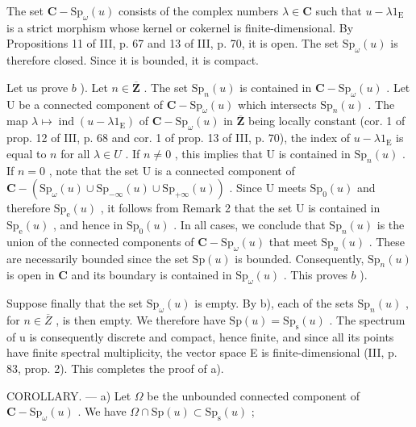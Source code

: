 The set \(\mathbf{C} - \mathrm{Sp}_{\omega}(u)\) consists of the complex numbers \(\lambda \in \mathbf{C}\) such that \(u - \lambda 1_{\mathrm{E}}\) is a strict morphism whose kernel or cokernel is finite-dimensional. By Propositions 11 of III, p. 67 and 13 of III, p. 70, it is open. The set \(\mathrm{Sp}_{\omega}(u)\) is therefore closed. Since it is bounded, it is compact.

Let us prove \(b\) ). Let \(n \in \overline{\mathbf{Z}}\) . The set \(\mathrm{Sp}_n(u)\) is contained in \(\mathbf{C} - \mathrm{Sp}_{\omega}(u)\) . Let U be a connected component of \(\mathbf{C} - \mathrm{Sp}_{\omega}(u)\) which intersects \(\mathrm{Sp}_n(u)\) . The map \(\lambda \mapsto \operatorname{ind}(u - \lambda 1_{\mathrm{E}})\) of \(\mathbf{C} - \mathrm{Sp}_{\omega}(u)\) in \(\overline{\mathbf{Z}}\) being locally constant (cor. 1 of prop. 12 of III, p. 68 and cor. 1 of prop. 13 of III, p. 70), the index of \(u - \lambda 1_{\mathrm{E}}\) is equal to \(n\) for all \(\lambda \in U\) . If \(n \neq 0\) , this implies that U is contained in \(\mathrm{Sp}_n(u)\) . If \(n = 0\) , note that the set U is a connected component of \(\mathbf{C} - (\mathrm{Sp}_{\omega}(u) \cup \mathrm{Sp}_{-\infty}(u) \cup \mathrm{Sp}_{+\infty}(u))\) . Since U meets \(\mathrm{Sp}_0(u)\) and therefore \(\mathrm{Sp}_{\mathrm{e}}(u)\) , it follows from Remark 2 that the set U is contained in \(\mathrm{Sp}_{\mathrm{e}}(u)\) , and hence in \(\mathrm{Sp}_0(u)\) . In all cases, we conclude that \(\mathrm{Sp}_n(u)\) is the union of the connected components of \(\mathbf{C} - \mathrm{Sp}_{\omega}(u)\) that meet \(\mathrm{Sp}_n(u)\) . These are necessarily bounded since the set \(\mathrm{Sp}(u)\) is bounded. Consequently, \(\mathrm{Sp}_n(u)\) is open in \(\mathbf{C}\) and its boundary is contained in \(\mathrm{Sp}_{\omega}(u)\) . This proves \(b\) ).

Suppose finally that the set \(\mathrm{Sp}_{\omega}(u)\) is empty. By b), each of the sets \(\mathrm{Sp}_{n}(u)\) , for \(n \in \overline{Z}\) , is then empty. We therefore have \(\mathrm{Sp}(u) = \mathrm{Sp}_{\mathrm{s}}(u)\) . The spectrum of u is consequently discrete and compact, hence finite, and since all its points have finite spectral multiplicity, the vector space E is finite-dimensional (III, p. 83, prop. 2). This completes the proof of a).

COROLLARY. --- a) Let \(\Omega\) be the unbounded connected component of \(\mathbf{C} - \mathrm{Sp}_{\omega}(u)\) . We have \(\Omega \cap \mathrm{Sp}(u) \subset \mathrm{Sp}_{\mathrm{s}}(u)\) ;

